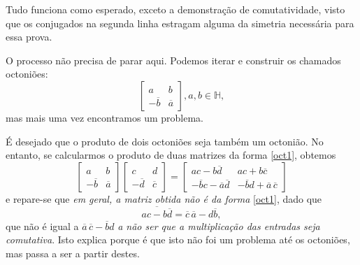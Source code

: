 \documentclass{article}
\renewcommand{\H}{\mathbb{H}}
\begin{document}
Tudo funciona como esperado, exceto a demonstração de comutatividade, visto que os conjugados na segunda linha estragam alguma da simetria necessária para essa prova.

O processo não precisa de parar aqui. Podemos iterar e construir os chamados octoniões:
\begin{equation}\label{oct1}
\begin{bmatrix} a & b \\ -\overline{b} & \overline{a} \end{bmatrix}, a, b \in \H,
\end{equation}
mas mais uma vez encontramos um problema.

É desejado que o produto de dois octoniões seja também um octonião. No entanto, se calcularmos o produto de duas matrizes da forma \eqref{oct1}, obtemos
\[\begin{bmatrix} a & b \\ -\overline{b} & \overline{a} \end{bmatrix} \begin{bmatrix} c & d \\ -\overline{d} & \overline{c} \end{bmatrix} = \begin{bmatrix} ac - b \overline{d} & ac + b \overline{c} \\ -\overline{b}c - \overline{a} \overline{d} & -\overline{b} d + \overline{a} \, \overline{c} \end{bmatrix}\]
e repare-se que \emph{em geral, a matriz obtida não é da forma} \eqref{oct1}, dado que
\[\overline{ac - b\overline{d}} = \overline{c} \, \overline{a} - d \overline{b},\]
que não é igual a $\overline{a}\,\overline{c} - \overline{b} d$ \emph{a não ser que a multiplicação das entradas seja comutativa}. Isto explica porque é que isto não foi um problema até os octoniões, mas passa a ser a partir destes.
\end{document}

